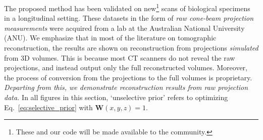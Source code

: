 \documentclass[journal]{IEEEtran}
\begin{document}
The proposed method has been validated on new\footnote {These and our code will be made available to the community.} scans of biological specimens in a longitudinal setting. These datasets in the form of \emph{raw cone-beam projection measurements} were acquired from a lab at the Australian National University (ANU). We emphasize that in most of the literature on tomographic reconstruction, the results are shown on reconstruction from projections \emph{simulated} from 3D volumes. This is because most CT scanners do not reveal the raw projections, and instead output only the full reconstructed volumes. Moreover, the process of conversion from the projections to the full volumes is proprietary. \emph{Departing from this, we demonstrate reconstruction results from raw projection data.} In all figures in this section, `unselective prior' refers to optimizing Eq.~\ref{eq:selective_prior} with $\boldsymbol{W}(x,y,z)=1$.
\end{document}

